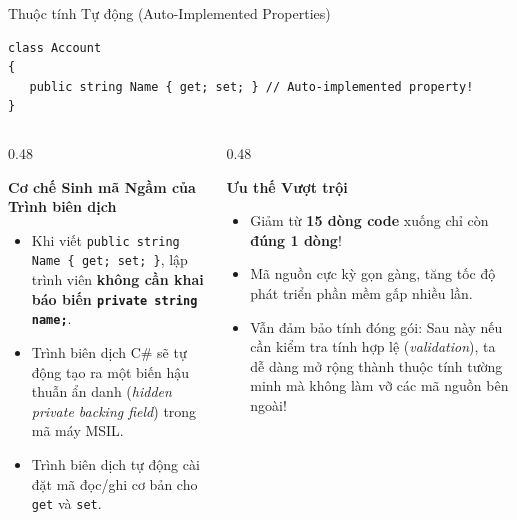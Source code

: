 \documentclass[aspectratio=169, 10pt]{beamer}
\begin{document}
\begin{frame}[fragile]{Thuộc tính Tự động (Auto-Implemented Properties)}
  \begin{tcolorbox}[colback=CodeBg,colframe=UniNavy,title=\textbf{Cú pháp Siêu Tinh gọn của Auto-Implemented Property},fonttitle=\small\bfseries]
\begin{lstlisting}
class Account
{
   public string Name { get; set; } // Auto-implemented property!
}
\end{lstlisting}
  \end{tcolorbox}
  \begin{columns}[T]
    \begin{column}{0.48\textwidth}
      \begin{block}{\textbf{Cơ chế Sinh mã Ngầm của Trình biên dịch}}
        \begin{itemize}\small
          \item Khi viết \texttt{public string Name \{ get; set; \}}, lập trình viên \textbf{không cần khai báo biến \texttt{private string name;}}.
          \item Trình biên dịch C\# sẽ tự động tạo ra một biến hậu thuẫn ẩn danh (\textit{hidden private backing field}) trong mã máy MSIL.
          \item Trình biên dịch tự động cài đặt mã đọc/ghi cơ bản cho \texttt{get} và \texttt{set}.
        \end{itemize}
      \end{block}
    \end{column}

    \begin{column}{0.48\textwidth}
      \begin{exampleblock}{\textbf{Ưu thế Vượt trội}}
        \begin{itemize}\small
          \item Giảm từ \textbf{15 dòng code} xuống chỉ còn \textbf{đúng 1 dòng}!
          \item Mã nguồn cực kỳ gọn gàng, tăng tốc độ phát triển phần mềm gấp nhiều lần.
          \item Vẫn đảm bảo tính đóng gói: Sau này nếu cần kiểm tra tính hợp lệ (\textit{validation}), ta dễ dàng mở rộng thành thuộc tính tường minh mà không làm vỡ các mã nguồn bên ngoài!
        \end{itemize}
      \end{exampleblock}
    \end{column}
  \end{columns}
\end{frame}
\end{document}
